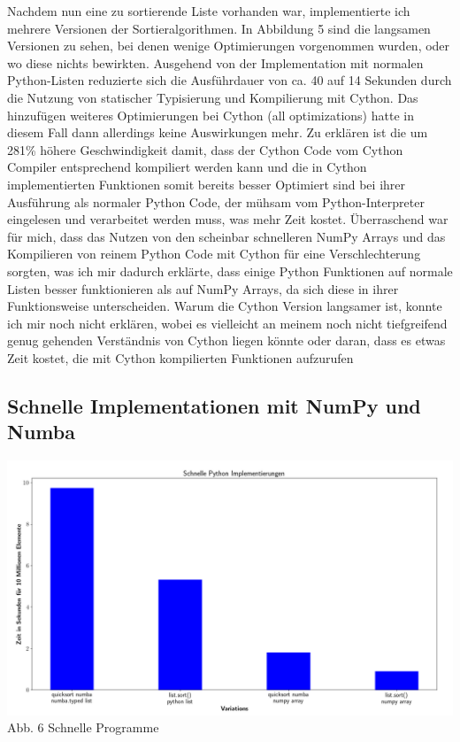 \documentclass[11pt,a4paper]{article}
\begin{document}
Nachdem nun eine zu sortierende Liste vorhanden war, implementierte ich mehrere Versionen der Sortieralgorithmen.
In Abbildung 5 sind die langsamen Versionen zu sehen, bei denen wenige Optimierungen vorgenommen wurden, oder wo diese nichts bewirkten.
Ausgehend von der Implementation mit normalen Python-Listen reduzierte sich die Ausführdauer von ca. 40 auf 14 Sekunden
durch die Nutzung von statischer Typisierung und Kompilierung mit Cython. Das hinzufügen weiteres Optimierungen
bei Cython (all optimizations) hatte in diesem Fall dann allerdings keine Auswirkungen mehr.
Zu erklären ist die um 281\% höhere Geschwindigkeit damit, dass der Cython Code vom Cython Compiler
entsprechend kompiliert werden kann und die in Cython implementierten Funktionen somit bereits besser
Optimiert sind bei ihrer Ausführung als normaler Python Code, der mühsam vom Python-Interpreter eingelesen
und verarbeitet werden muss, was mehr Zeit kostet.
Überraschend war für mich, dass das Nutzen von den scheinbar schnelleren NumPy Arrays und das Kompilieren
von reinem Python Code mit Cython für eine Verschlechterung sorgten, was ich mir dadurch erklärte, dass einige
Python Funktionen auf normale Listen besser funktionieren als auf NumPy Arrays, da sich diese in ihrer Funktionsweise
unterscheiden. Warum die Cython Version langsamer ist, konnte ich mir noch nicht erklären, wobei es vielleicht an meinem
noch nicht tiefgreifend genug gehenden Verständnis von Cython liegen könnte oder daran, dass es etwas Zeit kostet,
die mit Cython kompilierten Funktionen aufzurufen

\subsection{Schnelle Implementationen mit NumPy und Numba}

\begin{center}
    \hspace*{-1.5cm}\includegraphics[width=1.2\textwidth]{./diagramme/matplotlib/pythonschnell.png}
    Abb. 6 Schnelle Programme
\end{center}
\end{document}
